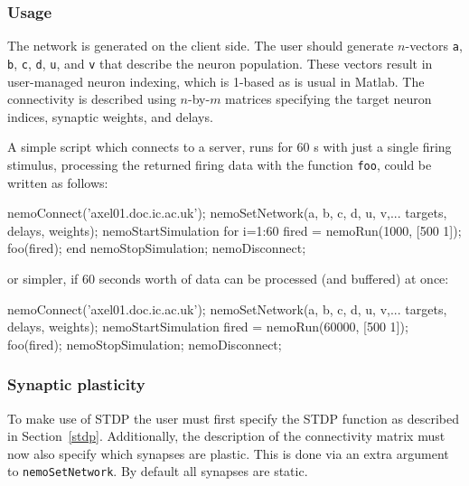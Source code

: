 \documentclass[a4paper]{article}
\newcommand{\code}[1]{\texttt{#1}}
\begin{document}
\subsubsection{Usage}

The network is generated on the client side. 
The user should generate $n$-vectors 
	\code{a}, \code{b}, \code{c}, \code{d}, \code{u}, and \code{v} 
	that describe the neuron population. 
These vectors result in user-managed neuron indexing,
	which is 1-based as is usual in Matlab.
The connectivity is described using $n$-by-$m$ matrices specifying the 
	target neuron indices,
	synaptic weights,
	and delays.

A simple script which connects to a server,
	runs for 60 s with just a single firing stimulus,
	processing the returned firing data with the function \code{foo},
	could be written as follows:

\begin{matlab}
 
nemoConnect('axel01.doc.ic.ac.uk');
nemoSetNetwork(a, b, c, d, u, v,...
                targets, delays, weights);
nemoStartSimulation
for i=1:60
	fired = nemoRun(1000, [500 1]);
	foo(fired);
end
nemoStopSimulation;
nemoDisconnect;
\end{matlab}

or simpler, if 60 seconds worth of data can be processed (and buffered) at once:

\begin{matlab}

nemoConnect('axel01.doc.ic.ac.uk');
nemoSetNetwork(a, b, c, d, u, v,...
                 targets, delays, weights);
nemoStartSimulation
fired = nemoRun(60000, [500 1]);
foo(fired);
nemoStopSimulation;
nemoDisconnect;
\end{matlab}

\subsubsection{Synaptic plasticity}

To make use of STDP the user must first specify the STDP function as described in Section~\ref{stdp}.
Additionally, the description of the connectivity matrix must now also specify which synapses are plastic. 
This is done via an extra argument to \code{nemoSetNetwork}.
By default all synapses are static.
\end{document}
